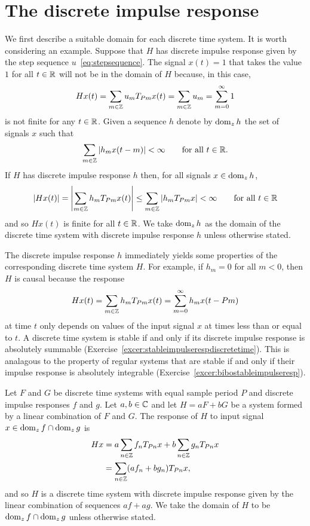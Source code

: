 \section{The discrete impulse response} \label{sec:discr-time-impulse}

We first describe a suitable domain for each discrete time system.  It is worth considering an example.  Suppose that $H$ has discrete impulse response given by the step sequence $u$~\eqref{eq:stepsequence}.  The signal $x(t) = 1$ that takes the value $1$ for all $t \in {\mathbb R}$ will not be in the domain of $H$ because, in this case,
\[
Hx(t) =  \sum_{m \in {\mathbb Z}} u_m T_{ P m} x(t) = \sum_{m \in {\mathbb Z}} u_m = \sum_{m=0}^\infty 1
\]
is not finite for any $t \in {\mathbb R}$.  Given a sequence $h$ denote by $\operatorname{dom}_z h$ the set of signals $x$ such that
\[
\sum_{m \in {\mathbb Z}} \left\vert h_m x(t - m) \right\vert < \infty \qquad \text{for all $t \in {\mathbb R}$}.
\]
If $H$ has discrete impulse response $h$ then, for all signals $x \in \operatorname{dom}_z h$,
\[
\left\vert Hx(t) \right\vert = \left\vert \sum_{m \in {\mathbb Z}} h_m T_{ P m} x(t) \right\vert \leq \sum_{m \in {\mathbb Z}}  \left\vert  h_m T_{ P m} x \right\vert < \infty \qquad \text{for all $t \in {\mathbb R}$}
\]
and so $Hx(t)$ is finite for all $t \in {\mathbb R}$.  We take $\operatorname{dom}_z h$ as the domain of the discrete time system with discrete impulse response $h$ unless otherwise stated.  %

The discrete impulse response $h$ immediately yields some properties of the corresponding discrete time system $H$.  For example, if $h_m = 0$ for all $m < 0$, then $H$ is causal because the response 
\[
Hx(t) = \sum_{m \in {\mathbb Z}} h_m T_{ P m}x(t) = \sum_{m =0}^\infty h_m x(t - Pm)
\] 
at time $t$ only depends on values of the input signal $x$ at times less than or equal to $t$.  A discrete time system is stable if and only if its discrete impulse response is absolutely summable (Exercise~\ref{excer:stableimpulserespdiscretetime}).  This is analagous to the property of regular systems that are stable if and only if their impulse response is absolutely integrable (Exercise~\ref{excer:bibostableimpulseresp}).

Let $F$ and $G$ be discrete time systems with equal sample period $P$ and discrete impulse responses $f$ and $g$.  Let $a,b\in{\mathbb C}$ and let $H = a F + b G$ be a system formed by a linear combination of $F$ and $G$.  The response of $H$ to input signal $x \in \operatorname{dom}_z f \cap \operatorname{dom}_z g$ is
\begin{align*}
Hx &= a \sum_{n \in {\mathbb Z}} f_{n} T_{ P n}x + b \sum_{n \in {\mathbb Z}} g_{n} T_{ P n}x \\
&=  \sum_{n \in {\mathbb Z}} (a f_{n} + b g_{n}) T_{ P n}x,
\end{align*}
and so $H$ is a discrete time system with discrete impulse response given by the linear combination of sequences $af + ag$.  We take the domain of $H$ to be $\operatorname{dom}_z f \cap \operatorname{dom}_z g$ unless otherwise stated.

